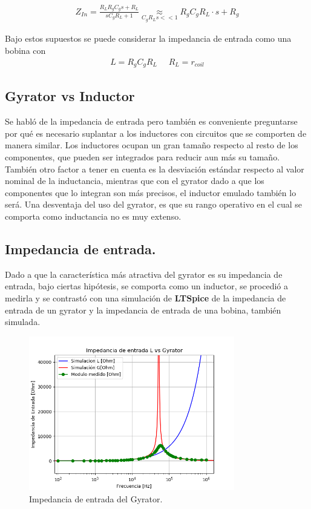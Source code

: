 \begin{align}Z_{In}=\frac{R_LR_gC_gs+R_L}{sC_gR_L+1}\underset{C_gR_Ls << 1}{\approx}R_gC_gR_L \cdot s + R_g 
\label{eq:Zintrans}
\end{align}

Bajo estos supuestos se puede considerar la impedancia de entrada como una bobina con 
\begin{align}  L=R_gC_gR_L  \ \ \ \ \ \  R_L=r_{coil} \label{eq:basicL1}\end{align}
\flushleft
\subsection{Gyrator vs Inductor}
Se habló de la impedancia de entrada pero también es conveniente preguntarse por qué es necesario suplantar a los inductores con circuitos que se comporten de manera similar.
Los inductores ocupan un gran tamaño respecto al resto de los componentes, que pueden ser integrados para reducir aun más su tamaño. También otro factor a tener en cuenta es la desviación estándar respecto al valor nominal de la inductancia, mientras que con el gyrator dado a que los componentes que lo integran son más precisos, el inductor emulado también lo será. Una desventaja del uso del gyrator, es que su rango operativo en el cual se comporta como inductancia no es muy extenso.

\subsection{Impedancia de entrada.}
\label{section:zin}
Dado a que la característica más atractiva del gyrator es su impedancia de entrada, bajo ciertas hipótesis, se comporta como un inductor, se procedió a medirla y se contrastó con una simulación de \textbf{LTSpice} de la impedancia de entrada de un gyrator y la impedancia de entrada de una bobina, también simulada.
\begin{figure}[H]	
	\centering
	\includegraphics[width=0.8\textwidth]{ImagenesEj2/ZinG.png}
	\caption{Impedancia de entrada del Gyrator.}
	\label{fig:ZinG}
\end{figure}

